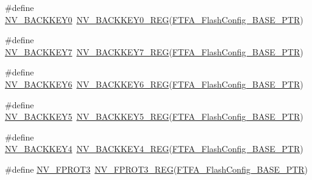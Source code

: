 \begin{DoxyCompactItemize}
\item 
\#define \hyperlink{group___n_v___register___accessor___macros_gadb8e2eb4db4de2a485b31c2a1dd393af}{N\+V\+\_\+\+B\+A\+C\+K\+K\+E\+Y0}~\hyperlink{group___n_v___register___accessor___macros_ga905f2d4f792d634634d339e5b6170fe1}{N\+V\+\_\+\+B\+A\+C\+K\+K\+E\+Y0\+\_\+\+R\+EG}(\hyperlink{group___n_v___peripheral_ga3458652dfc38239f92682556e63596b5}{F\+T\+F\+A\+\_\+\+Flash\+Config\+\_\+\+B\+A\+S\+E\+\_\+\+P\+TR})
\item 
\#define \hyperlink{group___n_v___register___accessor___macros_gaf4c4eb8173a514a0fe632f29e80423d4}{N\+V\+\_\+\+B\+A\+C\+K\+K\+E\+Y7}~\hyperlink{group___n_v___register___accessor___macros_ga7f6090f0eb664b59d0e6e79b492fe8e4}{N\+V\+\_\+\+B\+A\+C\+K\+K\+E\+Y7\+\_\+\+R\+EG}(\hyperlink{group___n_v___peripheral_ga3458652dfc38239f92682556e63596b5}{F\+T\+F\+A\+\_\+\+Flash\+Config\+\_\+\+B\+A\+S\+E\+\_\+\+P\+TR})
\item 
\#define \hyperlink{group___n_v___register___accessor___macros_ga74544d83ca29fc4d859726eb023dadb9}{N\+V\+\_\+\+B\+A\+C\+K\+K\+E\+Y6}~\hyperlink{group___n_v___register___accessor___macros_ga9d64e9e2568804d0cf1de4cb5a1d3f1f}{N\+V\+\_\+\+B\+A\+C\+K\+K\+E\+Y6\+\_\+\+R\+EG}(\hyperlink{group___n_v___peripheral_ga3458652dfc38239f92682556e63596b5}{F\+T\+F\+A\+\_\+\+Flash\+Config\+\_\+\+B\+A\+S\+E\+\_\+\+P\+TR})
\item 
\#define \hyperlink{group___n_v___register___accessor___macros_ga7b8e49b6530c2192672343b7f32ae5e8}{N\+V\+\_\+\+B\+A\+C\+K\+K\+E\+Y5}~\hyperlink{group___n_v___register___accessor___macros_gaeeb967dc21f8077cef911eae743d7f12}{N\+V\+\_\+\+B\+A\+C\+K\+K\+E\+Y5\+\_\+\+R\+EG}(\hyperlink{group___n_v___peripheral_ga3458652dfc38239f92682556e63596b5}{F\+T\+F\+A\+\_\+\+Flash\+Config\+\_\+\+B\+A\+S\+E\+\_\+\+P\+TR})
\item 
\#define \hyperlink{group___n_v___register___accessor___macros_ga5f7ba38a88074b8b658dfe992c73482c}{N\+V\+\_\+\+B\+A\+C\+K\+K\+E\+Y4}~\hyperlink{group___n_v___register___accessor___macros_gae867c53e6918c6a7c16ccba9ee512dc1}{N\+V\+\_\+\+B\+A\+C\+K\+K\+E\+Y4\+\_\+\+R\+EG}(\hyperlink{group___n_v___peripheral_ga3458652dfc38239f92682556e63596b5}{F\+T\+F\+A\+\_\+\+Flash\+Config\+\_\+\+B\+A\+S\+E\+\_\+\+P\+TR})
\item 
\#define \hyperlink{group___n_v___register___accessor___macros_ga04c3d23d8164e3fb7fb4f3e011869b5a}{N\+V\+\_\+\+F\+P\+R\+O\+T3}~\hyperlink{group___n_v___register___accessor___macros_gad8e367bb2e9aae8570a3736ec8a4aee9}{N\+V\+\_\+\+F\+P\+R\+O\+T3\+\_\+\+R\+EG}(\hyperlink{group___n_v___peripheral_ga3458652dfc38239f92682556e63596b5}{F\+T\+F\+A\+\_\+\+Flash\+Config\+\_\+\+B\+A\+S\+E\+\_\+\+P\+TR})

\end{DoxyCompactItemize}
